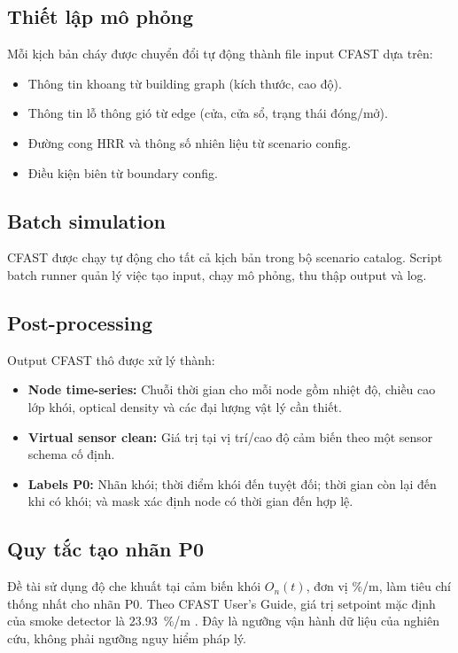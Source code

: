 \subsection{Thiết lập mô phỏng}

Mỗi kịch bản cháy được chuyển đổi tự động thành file input CFAST dựa trên:
\begin{itemize}
  \item Thông tin khoang từ building graph (kích thước, cao độ).
  \item Thông tin lỗ thông gió từ edge (cửa, cửa sổ, trạng thái đóng/mở).
  \item Đường cong HRR và thông số nhiên liệu từ scenario config.
  \item Điều kiện biên từ boundary config.
\end{itemize}

\subsection{Batch simulation}

CFAST được chạy tự động cho tất cả kịch bản trong bộ scenario catalog. Script batch runner quản lý việc tạo input, chạy mô phỏng, thu thập output và log.

\subsection{Post-processing}

Output CFAST thô được xử lý thành:
\begin{itemize}
  \item \textbf{Node time-series:} Chuỗi thời gian cho mỗi node gồm nhiệt độ, chiều cao lớp khói, optical density và các đại lượng vật lý cần thiết.
  \item \textbf{Virtual sensor clean:} Giá trị tại vị trí/cao độ cảm biến theo một sensor schema cố định.
  \item \textbf{Labels P0:} Nhãn khói; thời điểm khói đến tuyệt đối; thời gian còn lại đến khi có khói; và mask xác định node có thời gian đến hợp lệ.
\end{itemize}

\subsection{Quy tắc tạo nhãn P0}

Đề tài sử dụng độ che khuất tại cảm biến khói $O_n(t)$, đơn vị \%/m, làm tiêu chí thống nhất cho nhãn P0. Theo CFAST User's Guide, giá trị setpoint mặc định của smoke detector là $23.93$~\%/m \cite{cfast_guide}. Đây là ngưỡng vận hành dữ liệu của nghiên cứu, không phải ngưỡng nguy hiểm pháp lý.

